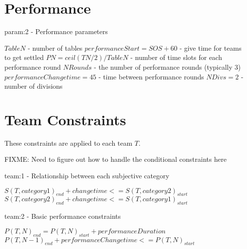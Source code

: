 \documentclass[letterpaper,11pt]{report}
\begin{document}
\FloatBarrier
\section{Performance}
\begin{algorithm}
\caption{param:2 - Performance parameters}
\begin{algorithmic}
\STATE $TableN$ - number of tables
\STATE $performanceStart = SOS + 60$ - give time for teams to get settled
\STATE $PN = ceil(TN / 2) / TableN$ - number of time slots for each
performance round
\STATE $NRounds$ - the number of performance rounds (typically 3)
\STATE $performanceChangetime = 45$ - time between performance rounds
\STATE $NDivs = 2$ - number of divisions
\end{algorithmic}
\end{algorithm}

\FloatBarrier
\section{Team Constraints}
These constraints are applied to each team $T$.

FIXME: Need to figure out how to handle the conditional constraints here
\begin{algorithm}
\caption{team:1 - Relationship between each subjective category}
\begin{algorithmic}
        \STATE $S(T, category1)_{end} + changetime <= S(T, category2)_{start}$
      \ELSE
        \STATE $S(T, category2)_{end} + changetime <= S(T, category1)_{start}$
      \ENDIF
    \ENDIF
  \ENDFOR
\ENDFOR
\end{algorithmic}
\end{algorithm}

\begin{algorithm}
\caption{team:2 - Basic performance constraints}
\begin{algorithmic}
  \STATE $P(T, N)_{end} = P(T, N)_{start} + performanceDuration$
\ENDFOR
{}
  \STATE $P(T, N-1)_{end} + performanceChangetime <= P(T, N)_{start}$
\ENDFOR
\end{algorithmic}
\end{algorithm}
\end{document}
